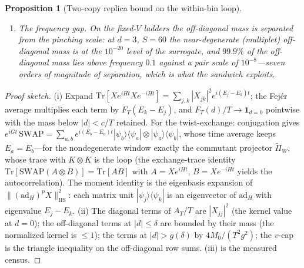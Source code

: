 \documentclass[11pt,a4paper]{article}
\theoremstyle{plain}
\newtheorem{proposition}[theorem]{Proposition}
\theoremstyle{definition}
\theoremstyle{remark}
\begin{document}
\begin{proposition}[Two-copy replica bound on the within-bin loop]
\begin{enumerate}[leftmargin=1.6em]
\begin{equation*}
\frac{A_T}{T}-m(\delta)-\frac{4M_0}{T^{2}g(\delta)^{2}}
\;\le\;\sum_{j\in W}a_j^{2}\;\le\;\frac{A_T}{T},
\end{equation*}
the tail term from $F_T(d)/T\le\min\{1,\,4/(T^{2}d^{2})\}$ for $d\neq0$;
and the near-diagonal mass is capped a priori by the quantum variances,
$|X_{jk}|^{2}\le\sum_{m\neq j}|X_{mj}|^{2}=\langle\psi_j|K^{2}|\psi_j
\rangle-a_j^{2}$, so $m(\delta)$ is bounded by censused
intra-eigenstate variances.
\item \emph{The frequency gap.} On the fixed-$V$ ladders the off-diagonal
mass is separated from the pinching scale: at $d=3$, $S=60$ the
near-degenerate (multiplet) off-diagonal mass is at the $10^{-20}$ level
of the surrogate, and $99.9\%$ of the off-diagonal mass lies above
frequency $0.1$ against a pair scale of $10^{-8}$---seven orders of
magnitude of separation, which is what the sandwich exploits.
\end{enumerate}
\end{proposition}

\begin{proof}[Proof sketch]
(i) Expand $\mathrm{Tr}[Xe^{iHt}Xe^{-iHt}]=\sum_{j,k}|X_{jk}|^{2}
e^{i(E_j-E_k)t}$; the Fej\'er average multiplies each term by
$F_T(E_k-E_j)$, and $F_T(d)/T\to\mathbf{1}_{d=0}$ pointwise with the
mass below $|d|<c/T$ retained.  For the twist-exchange: conjugation gives
$e^{iGt}\,\mathrm{SWAP}=\sum_{a,b}e^{i(E_b-E_a)t}|\psi_b\rangle\langle
\psi_a|\otimes|\psi_a\rangle\langle\psi_b|$, whose time average keeps
$E_a=E_b$---for the nondegenerate window exactly the commutant projector
$\widetilde{\Pi}_W$, whose trace with $K\otimes K$ is the loop (the
exchange-trace identity $\mathrm{Tr}[\mathrm{SWAP}(A\otimes B)]=
\mathrm{Tr}[AB]$ with $A=Xe^{iHt}$, $B=Xe^{-iHt}$ yields the
autocorrelation).  The moment identity is the eigenbasis expansion of
$\|(\mathrm{ad}_H)^pX\|^2_{\mathrm{HS}}$: each matrix unit
$|\psi_j\rangle\langle\psi_k|$ is an eigenvector of $\mathrm{ad}_H$ with
eigenvalue $E_j-E_k$.  (ii) The diagonal terms of $A_T/T$ are
$|X_{jj}|^{2}$ (the kernel value at $d=0$); the off-diagonal terms at
$|d|\le\delta$ are bounded by their mass (the normalized kernel is
$\le1$); the terms at $|d|>g(\delta)$ by $4M_0/(T^{2}g^{2})$; the
$v$-cap is the triangle inequality on the off-diagonal row sums.  (iii)
is the measured census.
\end{proof}
\end{document}
